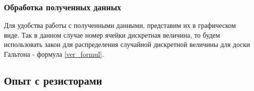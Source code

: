 \subsubsection{Обработка полученных данных}

Для удобства работы с полученными данными, представим их в графическом виде. Так в данном случае номер ячейки дискретная величина, то будем использовать закон для распределения случайной дискретной величины для доски Гальтона - формула \eqref{ver_formul}.
\subsection{Опыт с резисторами}


